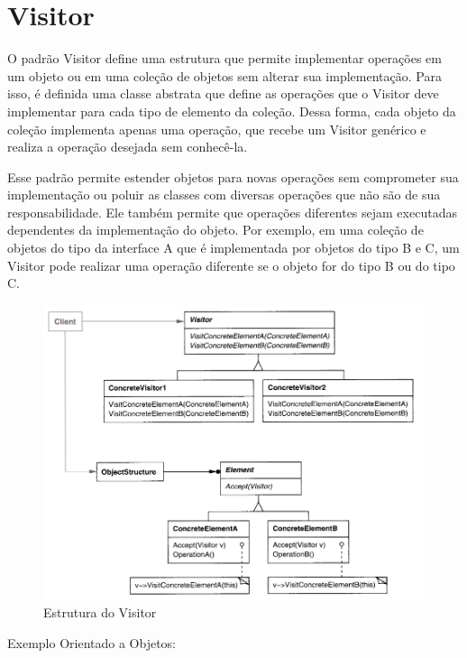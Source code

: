 \section{Visitor}

O padrão Visitor define uma estrutura que permite implementar 
operações em um objeto ou em uma coleção de objetos sem 
alterar sua implementação. Para isso, é definida uma classe 
abstrata que define as operações que o Visitor deve implementar 
para cada tipo de elemento da coleção. Dessa forma, cada 
objeto da coleção implementa apenas uma operação, que recebe 
um Visitor genérico e realiza a operação desejada sem 
conhecê-la.

Esse padrão permite estender objetos para novas operações 
sem comprometer sua implementação ou poluir as classes com 
diversas operações que não são de sua responsabilidade. Ele 
também permite que operações diferentes sejam executadas 
dependentes da implementação do objeto. Por exemplo, em uma 
coleção de objetos do tipo da interface A que é implementada 
por objetos do tipo B e C, um Visitor pode realizar uma 
operação diferente se o objeto for do tipo B ou do tipo C.

\begin{figure}[htb]
	\caption{\label{visitor_struct}Estrutura do Visitor}
	\begin{center}
	    \includegraphics[scale=0.3]{5_padroes-contexto-funcional/5.3_comportamentais/5.3.11_visitor/diagram.png}
	\end{center}
\end{figure}

Exemplo Orientado a Objetos:

